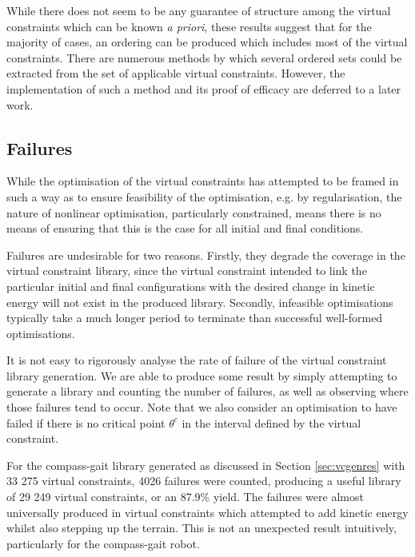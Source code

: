 While there does not seem to be any guarantee of structure among the virtual constraints which can be known \textit{a priori}, these results suggest that for the majority of cases, an ordering can be produced which includes most of the virtual constraints. There are numerous methods by which several ordered sets could be extracted from the set of applicable virtual constraints. However, the implementation of such a method and its proof of efficacy are deferred to a later work.

\subsection{Failures}
While the optimisation of the virtual constraints has attempted to be framed in such a way as to ensure feasibility of the optimisation, e.g. by regularisation, the nature of nonlinear optimisation, particularly constrained, means there is no means of ensuring that this is the case for all initial and final conditions.

Failures are undesirable for two reasons. Firstly, they degrade the coverage in the virtual constraint library, since the virtual constraint intended to link the particular initial and final configurations with the desired change in kinetic energy will not exist in the produced library. Secondly, infeasible optimisations typically take a much longer period to terminate than successful well-formed optimisations.

It is not easy to rigorously analyse the rate of failure of the virtual constraint library generation. We are able to produce some result by simply attempting to generate a library and counting the number of failures, as well as observing where those failures tend to occur. Note that we also consider an optimisation to have failed if there is no critical point $\theta^c$ in the interval defined by the virtual constraint.

For the compass-gait library generated as discussed in Section \ref{sec:vcgenres} with 33 275 virtual constraints, 4026 failures were counted, producing a useful library of 29 249 virtual constraints, or an 87.9\% yield. The failures were almost universally produced in virtual constraints which attempted to add kinetic energy whilst also stepping up the terrain. This is not an unexpected result intuitively, particularly for the compass-gait robot.